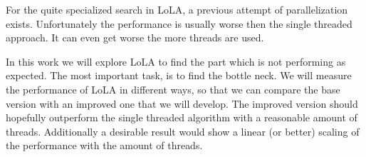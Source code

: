 For the quite specialized search in LoLA, a previous attempt of parallelization exists. Unfortunately the performance is usually worse then the single threaded approach. It can even get worse the more threads are used.

In this work we will explore LoLA to find the part which is not performing as expected. The most important task, is to find the bottle neck. We will measure the performance of LoLA in different ways, so that we can compare the base version with an improved one that we will develop. The improved version should hopefully outperform the single threaded algorithm with a reasonable amount of threads. Additionally a desirable result would show a linear (or better) scaling of the performance with the amount of threads.


